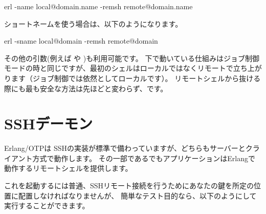 \begin{VerbatimText}
erl -name local@domain.name -remsh remote@domain.name
\end{VerbatimText}

ショートネームを使う場合は、以下のようになります。

\begin{VerbatimText}
erl -sname local@domain -remsh remote@domain
\end{VerbatimText}

その他の引数(例えば  や )も利用可能です。
下で動いている仕組みはジョブ制御モードの時と同じですが、最初のシェルはローカルではなくリモートで立ち上がります（ジョブ制御では依然としてローカルです）。
リモートシェルから抜ける際にも最も安全な方法は先ほどと変わらず、です。

\section{SSHデーモン}

Erlang/OTPは SSHの実装が標準で備わっていますが、どちらもサーバーとクライアント方式で動作します。
その一部であるでもアプリケーションはErlangで動作するリモートシェルを提供します。%

これを起動するには普通、SSHリモート接続を行うためにあなたの鍵を所定の位置に配置しなければなりませんが、
簡単なテスト目的なら、以下のようにして実行することができます。


